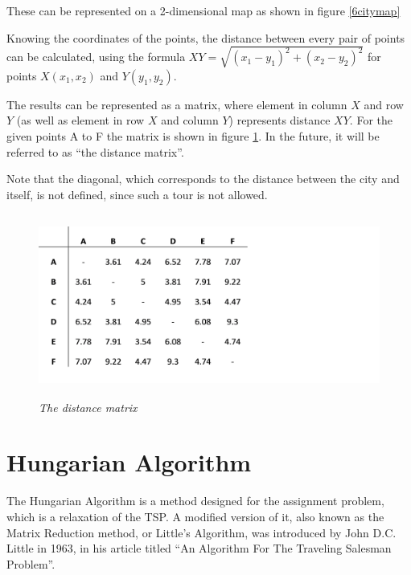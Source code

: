These can be represented on a 2-dimensional map as shown in figure \ref{6citymap}


\par
Knowing the coordinates of the points, the distance between every pair of points can be calculated, using the formula $XY=\sqrt{(x_1-y_1)^2+(x_2-y_2)^2}$  for points $X(x_1, x_2)$ and $Y(y_1, y_2)$.

\vspace{5mm}

The results can be represented as a matrix, where element in column $X$ and row $Y$ (as well as element in row $X$ and column $Y$) represents distance $XY$. For the given points A to F the matrix is shown in figure \ref{distancematrix}. In the future, it will be referred to as “the distance matrix”.

\vspace{5mm}

Note that the diagonal, which corresponds to the distance between the city and itself, is not defined, since such a tour is not allowed.

\begin{figure}[bh] 
	\centering
	\includegraphics[height=6cm]{distancematrix}
	\caption{\textsl{The distance matrix}}
	\label{distancematrix}
\end{figure}




\section{Hungarian Algorithm}

The Hungarian Algorithm is a method designed for the assignment problem, which is a relaxation of the TSP. A modified version of it, also known as the Matrix Reduction method, or Little’s Algorithm, was introduced by John D.C. Little in 1963, in his article titled “An Algorithm For The Traveling Salesman Problem”.

